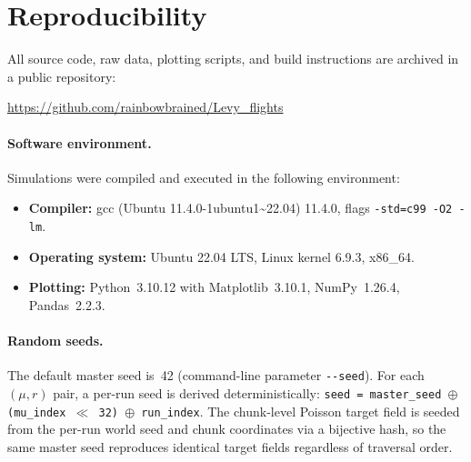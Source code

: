 \section{Reproducibility}
\label{sec:reproducibility}

All source code, raw data, plotting scripts, and build instructions
are archived in a public repository:
\begin{center}
\url{https://github.com/rainbowbrained/Levy_flights}
\end{center}

\paragraph{Software environment.}
Simulations were compiled and executed in the following environment:
\begin{itemize}
  \item \textbf{Compiler:} gcc (Ubuntu 11.4.0-1ubuntu1\textasciitilde 22.04) 11.4.0,
        flags \texttt{-std=c99 -O2 -lm}.
  \item \textbf{Operating system:} Ubuntu 22.04 LTS,
        Linux kernel 6.9.3, x86\_64.
  \item \textbf{Plotting:} Python~3.10.12 with
        Matplotlib~3.10.1, NumPy~1.26.4, Pandas~2.2.3.
\end{itemize}

\paragraph{Random seeds.}
The default master seed is~42 (command-line parameter
\texttt{-{}-seed}).  For each $(\mu, r)$ pair, a per-run seed
is derived deterministically:
\texttt{seed = master\_seed $\oplus$ (mu\_index $\ll$ 32) $\oplus$ run\_index}.
The chunk-level Poisson target field is seeded from the
per-run world seed and chunk coordinates via a bijective
hash, so the same master seed reproduces identical target
fields regardless of traversal order.

